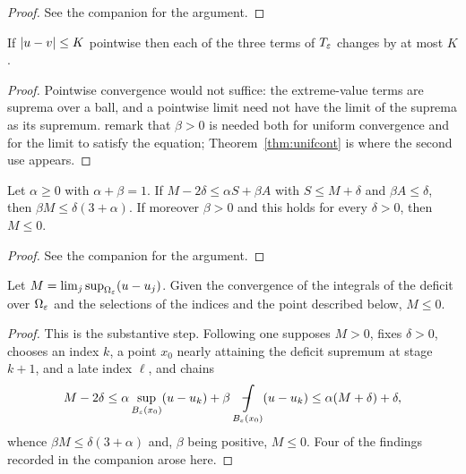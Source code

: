 \begin{proof}
\leanok
{}
See the companion for the argument.
\end{proof}


\begin{theorem}\label{thm:unifcont}
\leanok
If $\left\lvert u-v\right\rvert \le K$ pointwise then each of the three terms of $T_\varepsilon$ changes by
at most $K$.
\end{theorem}

\begin{proof}
\leanok
Pointwise convergence would not suffice: the extreme-value terms are suprema
over a ball, and a pointwise limit need not have the limit of the suprema as
its supremum.  remark that $\beta>0$ is needed both for uniform
convergence and for the limit to satisfy the equation;
Theorem~\ref{thm:unifcont} is where the second use appears.
\end{proof}


\begin{theorem}\label{thm:unifarith}
\leanok
Let $\alpha \ge 0$ with $\alpha+\beta=1$. If
$M - 2\delta \le \alpha S + \beta A$ with $S \le M+\delta$ and
$\beta A \le \delta$, then $\beta M \le \delta(3+\alpha)$. If moreover
$\beta>0$ and this holds for every $\delta>0$, then $M \le 0$.
\end{theorem}

\begin{proof}
\leanok
See the companion for the argument.
\end{proof}


\begin{theorem}\label{thm:unifconv}
\leanok
Let $M = \lim_j \sup_{\Omega_\varepsilon}(u - u_j)$. Given the convergence of the
integrals of the deficit over $\Omega_\varepsilon$ and the selections of the indices
and the point described below, $M \le 0$.
\end{theorem}

\begin{proof}
\leanok
{}
This is the substantive step. Following  one supposes
$M>0$, fixes $\delta>0$, chooses an index $k$, a point $x_0$ nearly attaining
the deficit supremum at stage $k+1$, and a late index $\ell$, and chains
\[
  M - 2\delta \le \alpha \sup_{B_\eps(x_0)}(u - u_k)
    + \beta \avgint_{B_\eps(x_0)}(u - u_k)
  \le \alpha(M+\delta) + \delta,
\]
whence $\beta M \le \delta(3+\alpha)$ and, $\beta$ being positive, $M \le 0$.
Four of the findings recorded in the companion arose here.
\end{proof}


